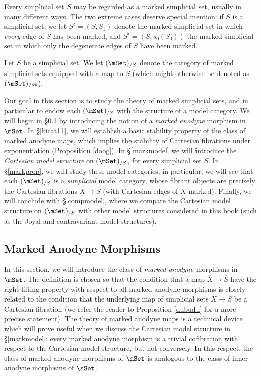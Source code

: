Every simplicial set $S$ may be regarded as a marked simplicial set, usually in many different ways. The two extreme cases deserve special mention: if $S$ is a simplicial set, we let $S^{\sharp} = (S,S_1)$ denote the marked simplicial set in which {\em every} edge of $S$ has been marked, and $S^{\flat} = (S, s_0(S_0))$ the marked simplicial set in which only the degenerate edges of $S$ have been marked.

\begin{notation}
Let $S$ be a simplicial set. We let $(\mSet)_{/S}$ denote the category of marked simplicial
sets equipped with a map to $S$ (which might otherwise be denoted as
$(\mSet)_{ / S^{\sharp} }$).
\end{notation}

Our goal in this section is to study the theory of marked simplicial sets, and in particular to endow 
each $(\mSet)_{/S}$ with the structure of a model category. We will begin in \S \ref{bicat1} by introducing the notion of a {\it marked anodyne} morphism in $\mSet$. In \S \ref{bicat11}, we will establish a basic stability property of the class of marked anodyne maps, which implies the stability of Cartesian fibrations under exponentiation (Proposition \ref{doog}). In \S \ref{markmodel} we will introduce the {\it Cartesian model structure} on $(\mSet)_{/S}$, for every simplicial set $S$. In \S \ref{markprop}, we will study these model categories; in particular, we will see that each $(\mSet)_{/S}$ is a {\it simplicial} model category, whose fibrant objects are precisely the 
Cartesian fibrations $X \rightarrow S$ (with Cartesian edges of $X$ marked). Finally, we will conclude with \S \ref{compmodel}, where we compare the Cartesian model structure on $(\mSet)_{/S}$ with other model structures considered in this book (such as the Joyal and contravariant model structures).

\subsection{Marked Anodyne Morphisms}\label{bicat1}

In this section, we will introduce the class of {\em marked anodyne} morphisms in
$\mSet$. The definition is chosen so that the condition that a map
$\overline{X} \rightarrow \overline{S}$ have the right lifting property with
respect to all marked anodyne morphisms is closely related to the condition
that the underlying map of simplicial sets $X \rightarrow S$ be a Cartesian fibration (we refer the reader to Proposition \ref{dubudu} for a more precise statement). The theory of marked anodyne maps is a technical device which will prove useful when we discuss the Cartesian model structure in
\S \ref{markmodel}: every marked anodyne morphism is a trivial cofibration with respect to the Cartesian model structure, but not conversely. In this respect, the class of marked anodyne morphisms of $\mSet$ is analogous to the class of inner anodyne morphisms of $\sSet$. 


